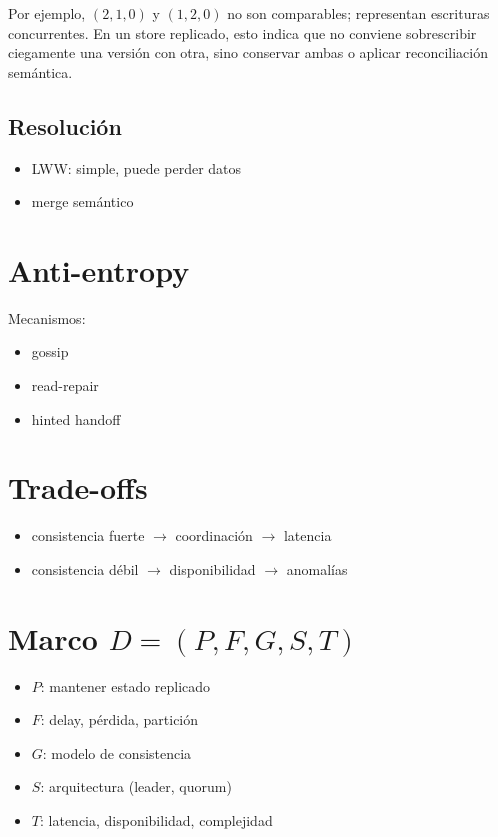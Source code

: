 \documentclass[variant=apuntes,cover=institutional,mode=screen]{ua-engineering-v6-article}
\begin{document}
Por ejemplo, $(2,1,0)$ y $(1,2,0)$ no son comparables; representan escrituras concurrentes. En un store replicado, esto indica que no conviene sobrescribir ciegamente una versión con otra, sino conservar ambas o aplicar reconciliación semántica.

\subsection{Resolución}

\begin{itemize}
\item LWW: simple, puede perder datos
\item merge semántico
\end{itemize}

\section{Anti-entropy}

Mecanismos:
\begin{itemize}
\item gossip
\item read-repair
\item hinted handoff
\end{itemize}

\section{Trade-offs}

\begin{itemize}
\item consistencia fuerte $\to$ coordinación $\to$ latencia
\item consistencia débil $\to$ disponibilidad $\to$ anomalías
\end{itemize}

\section{Marco $D=(P,F,G,S,T)$}

\begin{itemize}
\item $P$: mantener estado replicado
\item $F$: delay, pérdida, partición
\item $G$: modelo de consistencia
\item $S$: arquitectura (leader, quorum)
\item $T$: latencia, disponibilidad, complejidad
\end{itemize}
\end{document}
